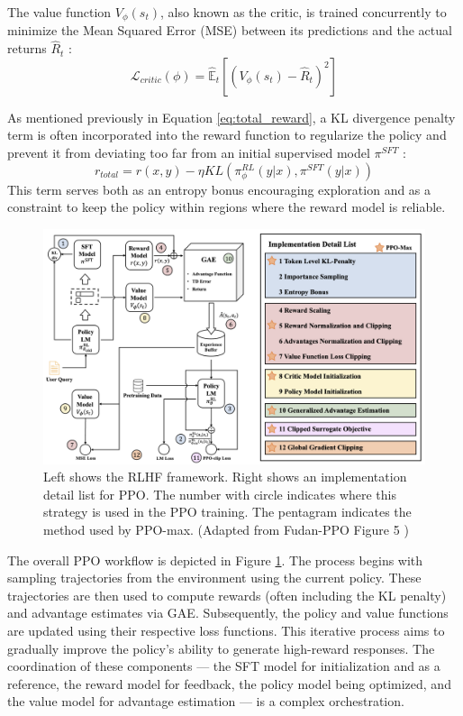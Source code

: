 \documentclass{article}
\begin{document}
The value function $V_\phi(s_t)$, also known as the critic, is trained concurrently to minimize the Mean Squared Error (MSE) between its predictions and the actual returns $\hat{R}_t$ \cite{Zheng2023PPO}:
\begin{equation}
    \label{eq:critic_loss}
    \mathcal{L}_{critic}(\phi) = \hat{\mathbb{E}}_{t} \left[ (V_\phi(s_t) - \hat{R}_t)^2 \right]
\end{equation}

As mentioned previously in Equation \ref{eq:total_reward}, a KL divergence penalty term is often incorporated into the reward function to regularize the policy and prevent it from deviating too far from an initial supervised model $\pi^{SFT}$ \cite{Zheng2023PPO}:
\begin{equation}
    \label{eq:kl_penalty}
    r_{total} = r(x,y) - \eta KL(\pi_\phi^{RL}(y|x),\pi^{SFT}(y|x))
\end{equation}
This term serves both as an entropy bonus encouraging exploration and as a constraint to keep the policy within regions where the reward model is reliable. \cite{Zheng2023PPO}

\begin{figure}[htbp]
    \centering
    \includegraphics[width=0.9\linewidth]{images/rlhf_overview_with_details.png}
    \caption{Left shows the RLHF framework. Right shows an implementation detail list for PPO. The number with circle indicates where this strategy is used in the PPO training. The pentagram indicates the method used by PPO-max. (Adapted from Fudan-PPO Figure 5 \cite{Zheng2023PPO})}
    \label{fig:ppo_workflow_fudan}
  \end{figure}

The overall PPO workflow is depicted in Figure \ref{fig:ppo_workflow_fudan}. The process begins with sampling trajectories from the environment using the current policy. These trajectories are then used to compute rewards (often including the KL penalty) and advantage estimates via GAE. Subsequently, the policy and value functions are updated using their respective loss functions. This iterative process aims to gradually improve the policy's ability to generate high-reward responses. The coordination of these components --- the SFT model for initialization and as a reference, the reward model for feedback, the policy model being optimized, and the value model for advantage estimation --- is a complex orchestration.
\end{document}
